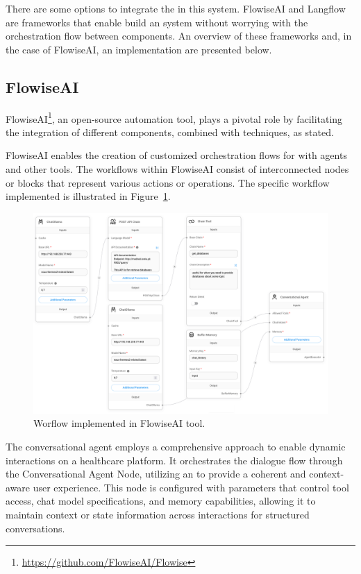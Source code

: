 There are some options to integrate the {\llm} in this system. FlowiseAI and Langflow are frameworks that enable build an {\llm} system without worrying with the orchestration flow between components. An overview of these frameworks and, in the case of FlowiseAI, an implementation are presented below.



\subsection{FlowiseAI}
\label{flowise}

FlowiseAI\footnote{\url{https://github.com/FlowiseAI/Flowise}}, an open-source automation tool, plays a pivotal role by facilitating the integration of different {\ai} components, combined with {\ir} techniques, as \citet{reis2024flowise} stated.

FlowiseAI enables the creation of customized orchestration flows for {\llm} with {\ai} agents and other tools. The workflows within FlowiseAI consist of interconnected nodes or blocks that represent various actions or operations. The specific workflow implemented is illustrated in Figure~\ref{fig_workflow}.


\begin{figure}[H]
    \includegraphics[width=\textwidth]{figs/chapter3/workflow.png}
    \centering
    \caption{Worflow implemented in FlowiseAI tool.}
    \label{fig_workflow}
\end{figure}


The conversational agent employs a comprehensive approach to enable dynamic interactions on a healthcare {\ir} platform. It orchestrates the dialogue flow through the Conversational Agent Node, utilizing an {\llm} to provide a coherent and context-aware user experience. This node is configured with parameters that control tool access, chat model specifications, and memory capabilities, allowing it to maintain context or state information across interactions for structured conversations.

